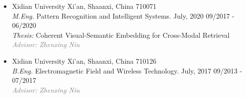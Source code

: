 \documentclass[10pt,margin,line,pifont,palatino,courier]{res}
\newenvironment{list1}{
  \begin{list}{\ding{113}}{%
      \setlength{\itemsep}{0in}
      \setlength{\parsep}{0in} \setlength{\parskip}{0in}
      \setlength{\topsep}{0in} \setlength{\partopsep}{0in}
      \setlength{\leftmargin}{0.17in}}}{\end{list}}
\newenvironment{list2}{
  \begin{list}{$\bullet$}{%
      \setlength{\itemsep}{0in}
      \setlength{\parsep}{0in} \setlength{\parskip}{0in}
      \setlength{\topsep}{0in} \setlength{\partopsep}{0in}
      \setlength{\leftmargin}{0.2in}}}{\end{list}}
\begin{document}
\begin{resume}
\begin{itemize}[leftmargin=*]
\item Xidian University \hfill Xi'an, Shaanxi, China 710071\\
	\textit{M.Eng.} Pattern Recognition and Intelligent Systems. July, 2020 \hfill 09/2017 - 06/2020\\
	\textit{Thesis:} Coherent Visual-Semantic Embedding for Cross-Modal Retrieval\\
    \textcolor{gray}{\small\it Advisor: Zhenxing Niu}
\item Xidian University \hfill Xi'an, Shaanxi, China 710126\\
	\textit{B.Eng.} Electromagnetic Field and Wireless Technology. July, 2017 \hfill 09/2013 - 07/2017\\
    \textcolor{gray}{\small\it Advisor: Zhenxing Niu}
\end{itemize}

%
%
%

%


\end{resume}
\end{document}
